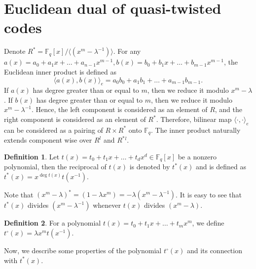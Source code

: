 \documentclass[12 pt]{extarticle}
\numberwithin{equation}{section}
\theoremstyle{definition}
\newtheorem{definition}{Definition}[section]
\begin{document}
\section{Euclidean dual of quasi-twisted codes}\label{dualcodes}
Denote $R^*=\mathbb{F}_q[x]/\langle (x^m-\lambda^{-1})\rangle$. For any $a(x)=a_0+a_1x+\dots+a_{n-1}x^{m-1},b(x)=b_0+b_1x+\dots+b_{m-1}x^{m-1}$, the Euclidean inner product is defined as
$$\langle a(x),b(x)\rangle_e=a_0b_0+a_1b_1+\dots+a_{m-1}b_{m-1}.$$
If $a(x)$ has degree greater than or equal to $m$, then we reduce it modulo $x^m-\lambda$. 
If $b(x)$ has degree greater than or equal to $m$, then we reduce it modulo $x^m-\lambda^{-1}$.
Hence, the left component is considered as an element of $R$, and the right component is considered as an element of $R^*$.  Therefore, bilinear map $\langle \cdot, \cdot\rangle_e$ can be considered as a pairing \cite{Lang} of $R \times R^*$ onto $\mathbb{F}_q$.  The inner product naturally extends component wise over $R^l$ and $R^*{^l}$.
\begin{definition}
    Let $t(x)=t_0+t_1x+\dots+t_dx^d\in \mathbb{F}_{q}[x]$ be a nonzero polynomial, then the reciprocal of $t(x)$ is denoted by $t^*(x)$ and is defined as $t^*(x)=x^{\deg t(x)}t(x^{-1})$.
\end{definition}
Note that $(x^m-\lambda)^*=(1-\lambda x^m)=-\lambda (x^m-\lambda^{-1})$. It is easy to see that $t^*(x)$ divides $(x^m-\lambda^{-1})$ whenever $t(x)$ divides $(x^m-\lambda)$.
\begin{definition}
    For a polynomial $t(x)=t_0+t_1x+\dots+t_mx^m$, we define $ t^{\circ}(x)=\lambda x^mt(x^{-1})$.
\end{definition}
 Now, we describe some properties of the polynomial $t^{\circ}(x)$ and its connection with $t^*(x)$.
\end{document}
